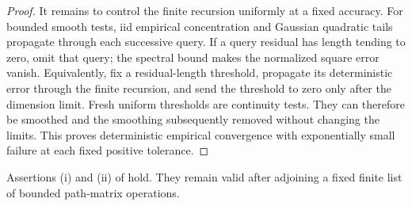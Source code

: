 \begin{proof}
It remains to control the finite recursion uniformly at a fixed
accuracy.  For bounded smooth tests, iid empirical concentration and
Gaussian quadratic tails propagate through each successive query.
If a query residual has length tending to zero, omit that query;
the spectral bound makes the normalized square error vanish.
Equivalently, fix a residual-length threshold, propagate its
deterministic error through the finite recursion, and send the
threshold to zero only after the dimension limit.  Fresh uniform
thresholds are continuity tests.  They can therefore be smoothed
and the smoothing subsequently removed without changing the limits.
This proves deterministic empirical convergence with exponentially
small failure at each fixed positive tolerance.
\end{proof}

\begin{lemma}
\label{lem:path-prediction}
Assertions \textup{(i)} and \textup{(ii)} of
 hold.  They remain valid after adjoining a
fixed finite list of bounded path-matrix operations.
\end{lemma}

